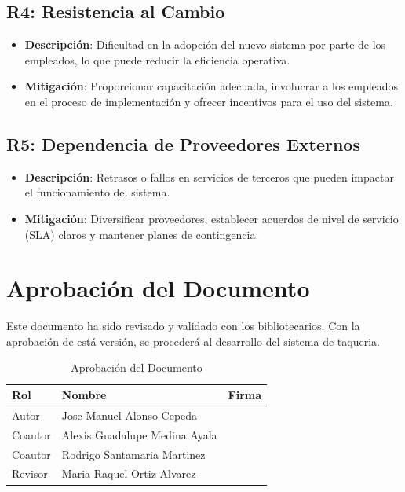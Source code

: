 \documentclass{article}
\begin{document}
\subsection{R4: Resistencia al Cambio}
\begin{itemize}
    \item \textbf{Descripción}: Dificultad en la adopción del nuevo sistema por parte de los empleados, lo que puede reducir la eficiencia operativa.
    \item \textbf{Mitigación}: Proporcionar capacitación adecuada, involucrar a los empleados en el proceso de implementación y ofrecer incentivos para el uso del sistema.
\end{itemize}

\subsection{R5: Dependencia de Proveedores Externos}
\begin{itemize}
    \item \textbf{Descripción}: Retrasos o fallos en servicios de terceros que pueden impactar el funcionamiento del sistema.
    \item \textbf{Mitigación}: Diversificar proveedores, establecer acuerdos de nivel de servicio (SLA) claros y mantener planes de contingencia.
\end{itemize}

\newpage
\section{Aprobación del Documento}
Este documento ha sido revisado y validado con los bibliotecarios. Con la aprobación de está versión, se
procederá al desarrollo del sistema de taqueria.

\begin{table}[h!]
\centering
\begin{tabular}{|p{4cm}|p{5cm}|p{5cm}|}
\hline
\textbf{Rol} & \textbf{Nombre} & \textbf{Firma} \\ \hline
Autor & Jose Manuel Alonso Cepeda & \\ \hline
Coautor & Alexis Guadalupe Medina Ayala & \\ \hline
Coautor & Rodrigo Santamaria Martinez & \\ \hline
Revisor & Maria Raquel Ortiz Alvarez & \\ \hline
\end{tabular}
\caption{Aprobación del Documento}
\label{tab:aprobacion_documento}
\end{table}
\end{document}
